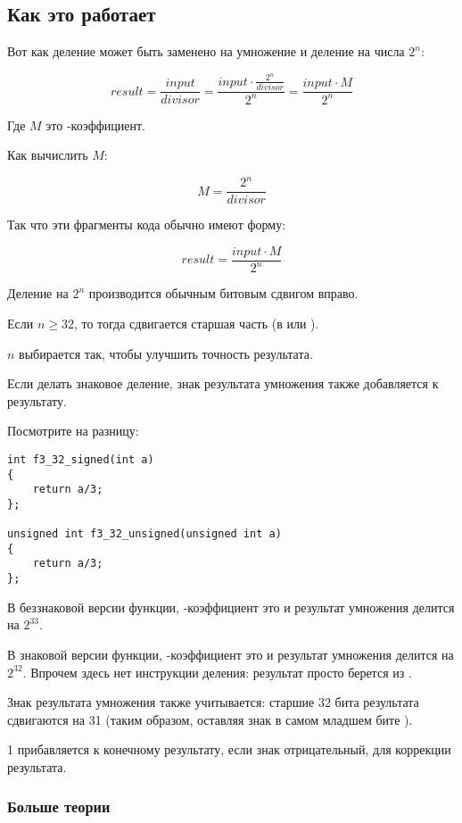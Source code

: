 ﻿\subsection{Как это работает}

Вот как деление может быть заменено на умножение и деление на числа $2^{n}$:

\[
	result = 
	\frac{input}{divisor} = 
	\frac{input \cdot \frac{2^{n}}{divisor}}{2^{n}} = 
	\frac{input \cdot M}{2^{n}}
\]

Где $M$ это -коэффициент.

Как вычислить $M$:

\[
	M = \frac{2^{n}}{divisor}
\]

Так что эти фрагменты кода обычно имеют форму:

\[
	result = \frac{input \cdot M}{2^{n}}
\]

Деление на $2^{n}$ производится обычным битовым сдвигом вправо.

Если $n\geq32$, то тогда сдвигается старшая часть  (в \EDX или \RDX).

$n$ выбирается так, чтобы улучшить точность результата.

Если делать знаковое деление, знак результата умножения также добавляется к результату.

Посмотрите на разницу:

\begin{lstlisting}
int f3_32_signed(int a)
{
	return a/3;
};

unsigned int f3_32_unsigned(unsigned int a)
{
	return a/3;
};
\end{lstlisting}

В беззнаковой версии функции, -коэффициент это  и результат умножения делится на $2^{33}$.

В знаковой версии функции, -коэффициент это
  и результат умножения делится на $2^{32}$.
Впрочем здесь нет инструкции деления: результат просто берется из \EDX. 

Знак результата умножения также учитывается: старшие 32 бита результата сдвигаются на 31
(таким образом, оставляя знак в самом младшем бите \EAX).

1 прибавляется к конечному результату, если знак отрицательный, для коррекции результата.



\subsubsection{Больше теории}


